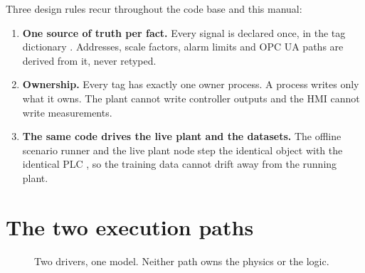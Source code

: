 Three design rules recur throughout the code base and this manual:

\begin{enumerate}
  \item \textbf{One source of truth per fact.} Every signal is declared once,
        in the tag dictionary . Addresses, scale factors,
        alarm limits and OPC UA paths are derived from it, never retyped.
  \item \textbf{Ownership.} Every tag has exactly one owner process. A process
        writes only what it owns. The plant cannot write controller outputs and
        the HMI cannot write measurements.
  \item \textbf{The same code drives the live plant and the datasets.} The
        offline scenario runner and the live plant node step the identical
         object with the identical PLC , so the
        training data cannot drift away from the running plant.
\end{enumerate}

\section{The two execution paths}

\begin{figure}[htbp]
\centering
{}
\caption{Two drivers, one model. Neither path owns the physics or the logic.}
\label{fig:paths}
\end{figure}

